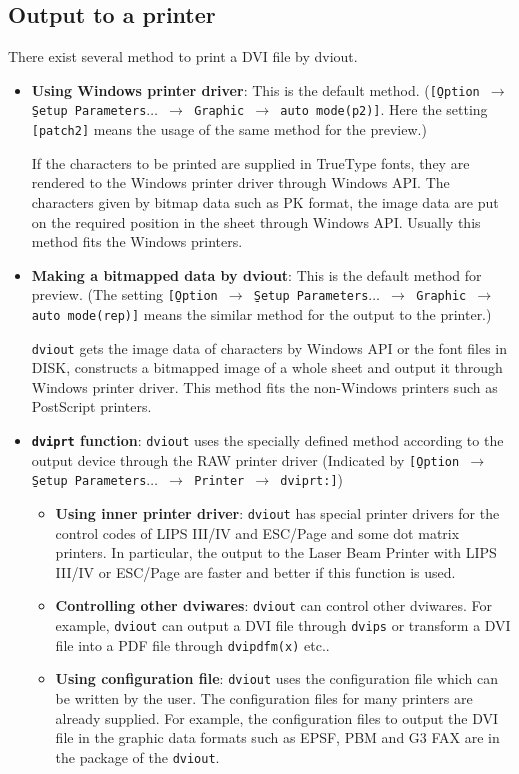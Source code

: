 \documentclass{article}
\begin{document}
\subsection{Output to a printer}
There exist several method to print a DVI file by dviout.
\begin{itemize}
\item
{\bf Using Windows printer driver}: 
This is the default method. ({\tt[\b{O}ption 
$\to$ \b{S}etup Parameters$\ldots$ $\to$ Graphic $\to$ auto mode(p2)]}.  
Here the setting {\tt[patch2]} means the usage of the same method for 
the preview.)
 
If the characters to be printed are supplied in TrueType fonts, they are
rendered to the Windows printer driver through Windows API.  
The characters given by bitmap data such as PK format, the image data are 
put on the required position in the sheet through Windows API. 
Usually this method fits the Windows printers.

\item
{\bf Making a bitmapped data by dviout}: 
This is the default method for preview.
(The setting {\tt[\b{O}ption $\to$ \b{S}etup Parameters$\ldots$ $\to$ 
Graphic $\to$ auto mode(rep)]} means the similar method for the output to 
the printer.)

{\tt dviout} gets the image data of characters by Windows API or the font 
files in DISK, constructs a bitmapped image of a whole sheet and output it 
through Windows printer driver.
This method fits the non-Windows printers such as PostScript printers.

\item
{\bf {\tt dviprt} function}: 
{\tt dviout} uses the specially defined method according to the output device 
through the RAW printer driver 
(Indicated by {\tt[\b{Op}tion $\to$ \b{S}etup Parameters$\ldots$ $\to$ Printer 
$\to$ dviprt:]})

\begin{itemize}
\item
{\bf Using inner printer driver}: 
{\tt dviout} has special printer drivers for the 
control codes of LIPS III/IV and ESC/Page and some dot matrix printers.  
In particular, the output to the Laser Beam Printer with LIPS III/IV or 
ESC/Page are faster and better if this function is used.

\item
{\bf Controlling other dviwares}:
{\tt dviout} can control other dviwares.  For example, {\tt dviout} can output 
a DVI file through {\tt dvips} or transform a DVI file into a PDF file
through {\tt dvipdfm(x)} etc..

\item
{\bf Using configuration file}:
{\tt dviout} uses the configuration file which can be written by the user.  
The configuration files for many printers are already supplied.  
For example, the configuration files to output the DVI file in the graphic 
data formats such as  EPSF, PBM and G3 FAX are in the package of 
the {\tt dviout}.
\end{itemize}
\end{itemize}
\end{document}
